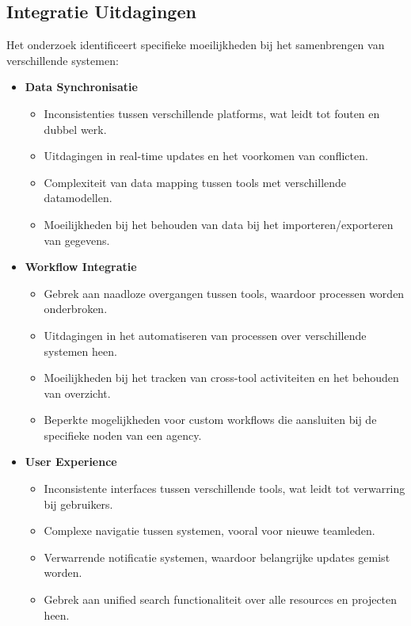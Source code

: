 \subsection{Integratie Uitdagingen}
\label{subsec:integratie}

Het \textcite{StackOverflow2023} onderzoek identificeert specifieke moeilijkheden bij het samenbrengen van verschillende systemen:

\begin{itemize}
    \item \textbf{Data Synchronisatie}
    \begin{itemize}
        \item Inconsistenties tussen verschillende platforms, wat leidt tot fouten en dubbel werk.
        \item Uitdagingen in real-time updates en het voorkomen van conflicten.
        \item Complexiteit van data mapping tussen tools met verschillende datamodellen.
        \item Moeilijkheden bij het behouden van data bij het importeren/exporteren van gegevens.
    \end{itemize}
    
    \item \textbf{Workflow Integratie}
    \begin{itemize}
        \item Gebrek aan naadloze overgangen tussen tools, waardoor processen worden onderbroken.
        \item Uitdagingen in het automatiseren van processen over verschillende systemen heen.
        \item Moeilijkheden bij het tracken van cross-tool activiteiten en het behouden van overzicht.
        \item Beperkte mogelijkheden voor custom workflows die aansluiten bij de specifieke noden van een agency.
    \end{itemize}
    
    \item \textbf{User Experience}
    \begin{itemize}
        \item Inconsistente interfaces tussen verschillende tools, wat leidt tot verwarring bij gebruikers.
        \item Complexe navigatie tussen systemen, vooral voor nieuwe teamleden.
        \item Verwarrende notificatie systemen, waardoor belangrijke updates gemist worden.
        \item Gebrek aan unified search functionaliteit over alle resources en projecten heen.
    \end{itemize}
\end{itemize}

